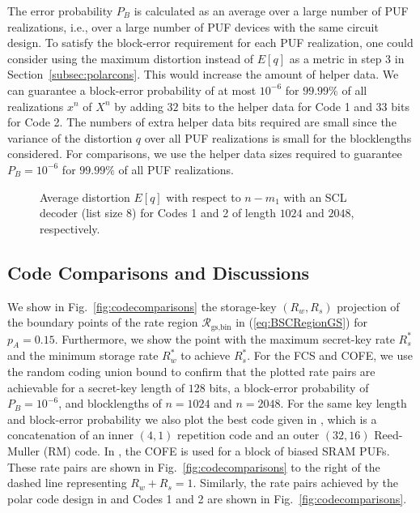 \documentclass[journal,10pt,twoside]{IEEEtran}
\begin{document}
The error probability $P_B$ is calculated as an average over a large number of PUF realizations, i.e., over a large number of PUF devices with the same circuit design. To satisfy the block-error requirement for each PUF realization, one could consider using the maximum distortion instead of $E[q]$ as a metric in step 3 in Section~\ref{subsec:polarcons}. This would increase the amount of helper data. We can guarantee a block-error probability of at most $10^{-6}$ for $99.99\%$ of all realizations $x^n$ of $X^n$ by adding $32$ bits to the helper data for Code 1 and $33$ bits for Code 2. The numbers of extra helper data bits required are small since the variance of the distortion $q$ over all PUF realizations is small for the blocklengths considered. For comparisons, we use the helper data sizes required to guarantee $P_B=10^{-6}$ for $99.99\%$ of all PUF realizations.
\begin{figure}[!t]
	
	\caption{Average distortion $E[q]$ with respect to $n-m_1$ with an SCL decoder (list size 8) for Codes 1 and 2 of length $1024$ and $2048$, respectively.}\label{fig:q10242048comb}
\end{figure}
\begin{figure*}[t] 
	\centering
	\newlength\figureheight
	\newlength\figurewidth
	\setlength\figureheight{5.75cm}
	\setlength\figurewidth{16.4cm}
	
	\caption{Storage-key rates for the GS model with $p_A=0.15$. The $(R_w^*,R_s^*)$ point is the best possible point achieved by SW-coding constructions, which lies on the dashed line representing $R_w+R_s = H(X)$. The block-error probability satisfies $P_B \leq 10^{-6}$ and the key length is 128 bits for all code points.}
	\label{fig:codecomparisons}
\end{figure*} 
\vspace{-0.45cm}
\subsection{Code Comparisons and Discussions}
We show in Fig.~\ref{fig:codecomparisons} the storage-key $(R_w,R_s)$ projection of the boundary points of the rate region $\mathcal{R}_{\text{gs,bin}}$ in (\ref{eq:BSCRegionGS}) for $p_A=0.15$. Furthermore, we show the point with the maximum secret-key rate $R_s^*$ and the minimum storage rate $R_w^*$ to achieve $R_s^*$. For the FCS and COFE, we use the random coding union bound \cite[Thm. 16]{Polyansky} to confirm that the plotted rate pairs are achievable for a secret-key length of $128$ bits, a block-error probability of $P_B=10^{-6}$, and blocklengths of $n=1024$ and $n=2048$. For the same key length and block-error probability we also plot the best code given in \cite{maes2009soft}, which is a concatenation of an inner $(4,1)$ repetition code and an outer $(32,16)$ Reed-Muller (RM) code. In \cite{maes2009soft}, the COFE is used for a block of biased SRAM PUFs. These rate pairs are shown in Fig.~\ref{fig:codecomparisons} to the right of the dashed line representing $R_w+R_s=1$. Similarly, the rate pairs achieved by the polar code design in \cite{IgnaPolar} and Codes 1 and 2 are shown in Fig.~\ref{fig:codecomparisons}. 
\end{document}

